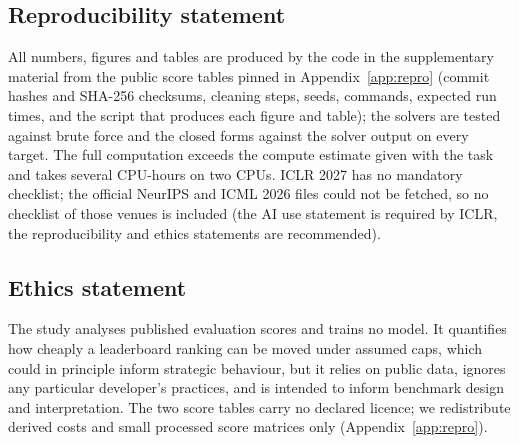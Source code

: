 \subsection*{Reproducibility statement}
All numbers, figures and tables are produced by the code in the supplementary material from the public score tables pinned in Appendix~\ref{app:repro} (commit hashes and SHA-256 checksums, cleaning steps, seeds, commands, expected run times, and the script that produces each figure and table); the solvers are tested against brute force and the closed forms against the solver output on every target.
The full computation exceeds the compute estimate given with the task and takes several CPU-hours on two CPUs.
ICLR 2027 has no mandatory checklist; the official NeurIPS and ICML 2026 files could not be fetched, so no checklist of those venues is included (the AI use statement is required by ICLR, the reproducibility and ethics statements are recommended).

\subsection*{Ethics statement}
The study analyses published evaluation scores and trains no model. It quantifies how cheaply a leaderboard ranking can be moved under assumed caps, which could in principle inform strategic behaviour, but it relies on public data, ignores any particular developer's practices, and is intended to inform benchmark design and interpretation. The two score tables carry no declared licence; we redistribute derived costs and small processed score matrices only (Appendix~\ref{app:repro}).
